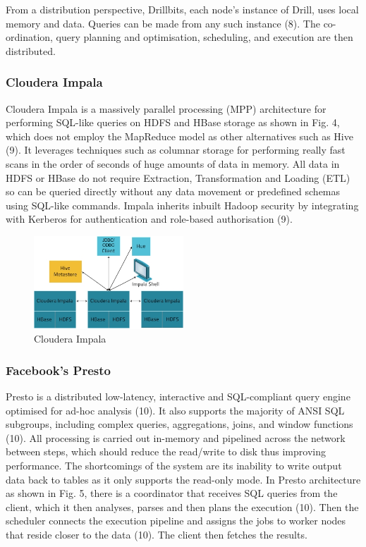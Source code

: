 From a distribution perspective, Drillbits, each node’s instance of Drill, uses local memory and data. Queries can be made from any such instance (8). The co-ordination, query planning and optimisation, scheduling, and execution are then distributed.

\subsubsection{Cloudera Impala} \label{subsubsec-lr-servinglayer-impala}
Cloudera Impala is a massively parallel processing (MPP) architecture for performing SQL-like queries on HDFS and HBase storage as shown in Fig. 4, which does not employ the MapReduce model as other alternatives such as Hive (9). It leverages techniques such as columnar storage for performing really fast scans in the order of seconds of huge amounts of data in memory. All data in HDFS or HBase do not require Extraction, Transformation and Loading (ETL) so can be queried directly without any data movement or predefined schemas using SQL-like commands. Impala inherits inbuilt Hadoop security by integrating with Kerberos for authentication and role-based authorisation (9).

\begin{figure}[H]
\centering
\includegraphics[width=0.5\textwidth]{Figures/impala.png}
\caption{Cloudera Impala}\label{fig-serving-impala}
\end{figure}

\subsubsection{Facebook’s Presto} \label{subsubsec-lr-servinglayer-presto}
Presto is a distributed low-latency, interactive and SQL-compliant query engine optimised for ad-hoc analysis (10). It also supports the majority of ANSI SQL subgroups, including complex queries, aggregations, joins, and window functions (10). All processing is carried out in-memory and pipelined across the network between steps, which should reduce the read/write to disk thus improving performance. The shortcomings of the system are its inability to write output data back to tables as it only supports the read-only mode. In Presto architecture as shown in Fig. 5, there is a coordinator that receives SQL queries from the client, which it then analyses, parses and then plans the execution (10). Then the scheduler connects the execution pipeline and assigns the jobs to worker nodes that reside closer to the data (10). The client then fetches the results.

